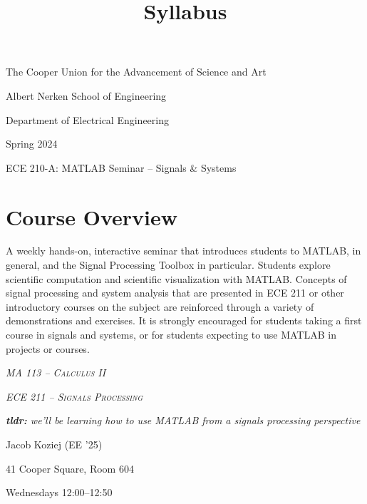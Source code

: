 \documentclass{article}
\title{Syllabus}
\begin{document}
\renderTitle

\scshape
\slshape

\begin{Centering}
\noindent
The Cooper Union for the Advancement of Science and Art

\noindent
Albert Nerken School of Engineering

\noindent
Department of Electrical Engineering

\noindent
Spring 2024

\leavevmode
\newline

\noindent
ECE 210-A: MATLAB Seminar -- Signals \& Systems

\end{Centering}

\normalfont

\section{Course Overview}


\begin{displayquote}
	A weekly hands-on, interactive seminar that introduces students
	to MATLAB, in general, and the Signal Processing Toolbox in
	particular.  Students explore scientific computation and
	scientific visualization with MATLAB.  Concepts of signal
	processing and system analysis that are presented in ECE 211 or
	other introductory courses on the subject are reinforced through
	a variety of demonstrations and exercises.  It is strongly
	encouraged for students taking a first course in signals and
	systems, or for students expecting to use MATLAB in projects or
	courses.

	\footnotesize

	\noindent
	 \textsc{\textsl{MA 113 -- Calculus II}}

	\noindent
	 \textsc{\textsl{ECE 211 -- Signals
	Processing}}

	\noindent
	\textsl{\textbf{tldr:} we'll be learning how to use MATLAB from
	a signals processing perspective}
\end{displayquote}

\noindent
{} Jacob Koziej (EE '25)

\noindent
{} 41 Cooper Square, Room 604

\noindent
{} Wednesdays 12:00--12:50
\end{document}
